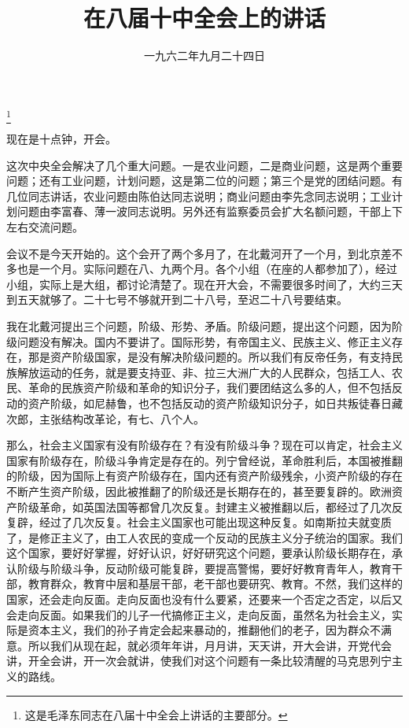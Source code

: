 
\title{在八届十中全会上的讲话}
\date{一九六二年九月二十四日}
\thanks{这是毛泽东同志在八届十中全会上讲话的主要部分。}
\maketitle


现在是十点钟，开会。

这次中央全会解决了几个重大问题。一是农业问题，二是商业问题，这是两个重要问题；还有工业问题，计划问题，这是第二位的问题；第三个是党的团结问题。有几位同志讲话，农业问题由陈伯达同志说明；商业问题由李先念同志说明；工业计划问题由李富春、薄一波同志说明。另外还有监察委员会扩大名额问题，干部上下左右交流问题。

会议不是今天开始的。这个会开了两个多月了，在北戴河开了一个月，到北京差不多也是一个月。实际问题在八、九两个月。各个小组（在座的人都参加了），经过小组，实际上是大组，都讨论清楚了。现在开大会，不需要很多时间了，大约三天到五天就够了。二十七号不够就开到二十八号，至迟二十八号要结束。

我在北戴河提出三个问题，阶级、形势、矛盾。阶级问题，提出这个问题，因为阶级问题没有解决。国内不要讲了。国际形势，有帝国主义、民族主义、修正主义存在，那是资产阶级国家，是没有解决阶级问题的。所以我们有反帝任务，有支持民族解放运动的任务，就是要支持亚、非、拉三大洲广大的人民群众，包括工人、农民、革命的民族资产阶级和革命的知识分子，我们要团结这么多的人，但不包括反动的资产阶级，如尼赫鲁，也不包括反动的资产阶级知识分子，如日共叛徒春日藏次郎，主张结构改革论，有七、八个人。

那么，社会主义国家有没有阶级存在？有没有阶级斗争？现在可以肯定，社会主义国家有阶级存在，阶级斗争肯定是存在的。列宁曾经说，革命胜利后，本国被推翻的阶级，因为国际上有资产阶级存在，国内还有资产阶级残余，小资产阶级的存在不断产生资产阶级，因此被推翻了的阶级还是长期存在的，甚至要复辟的。欧洲资产阶级革命，如英国法国等都曾几次反复。封建主义被推翻以后，都经过了几次反复辟，经过了几次反复。社会主义国家也可能出现这种反复。如南斯拉夫就变质了，是修正主义了，由工人农民的变成一个反动的民族主义分子统治的国家。我们这个国家，要好好掌握，好好认识，好好研究这个问题，要承认阶级长期存在，承认阶级与阶级斗争，反动阶级可能复辟，要提高警惕，要好好教育青年人，教育干部，教育群众，教育中层和基层干部，老干部也要研究、教育。不然，我们这样的国家，还会走向反面。走向反面也没有什么要紧，还要来一个否定之否定，以后又会走向反面。如果我们的儿子一代搞修正主义，走向反面，虽然名为社会主义，实际是资本主义，我们的孙子肯定会起来暴动的，推翻他们的老子，因为群众不满意。所以我们从现在起，就必须年年讲，月月讲，天天讲，开大会讲，开党代会讲，开全会讲，开一次会就讲，使我们对这个问题有一条比较清醒的马克思列宁主义的路线。

